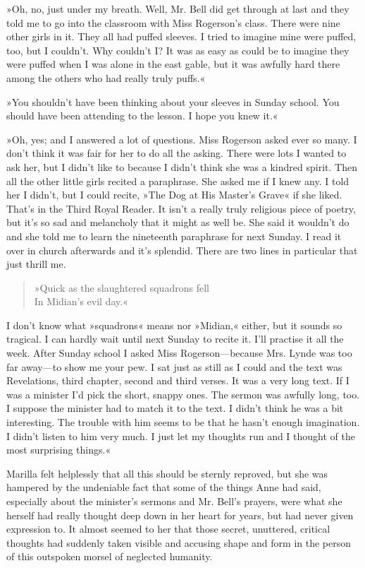 »Oh, no, just under my breath. Well, Mr. Bell did get through at last and they told me to go into the classroom with Miss Rogerson's class. There were nine other girls in it. They all had puffed sleeves. I tried to imagine mine were puffed, too, but I couldn't. Why couldn't I? It was as easy as could be to imagine they were puffed when I was alone in the east gable, but it was awfully hard there among the others who had really truly puffs.«

»You shouldn't have been thinking about your sleeves in Sunday school. You should have been attending to the lesson. I hope you knew it.«

»Oh, yes; and I answered a lot of questions. Miss Rogerson asked ever so many. I don't think it was fair for her to do all the asking. There were lots I wanted to ask her, but I didn't like to because I didn't think she was a kindred spirit. Then all the other little girls recited a paraphrase. She asked me if I knew any. I told her I didn't, but I could recite, »The Dog at His Master's Grave« if she liked. That's in the Third Royal Reader. It isn't a really truly religious piece of poetry, but it's so sad and melancholy that it might as well be. She said it wouldn't do and she told me to learn the nineteenth paraphrase for next Sunday. I read it over in church afterwards and it's splendid. There are two lines in particular that just thrill me.

\begin{verse}
»Quick as the slaughtered squadrons fell\\
In Midian's evil day.«
\end{verse}

I don't know what »squadrons« means nor »Midian,« either, but it sounds so tragical. I can hardly wait until next Sunday to recite it. I'll practise it all the week. After Sunday school I asked Miss Rogerson—because Mrs. Lynde was too far away—to show me your pew. I sat just as still as I could and the text was Revelations, third chapter, second and third verses. It was a very long text. If I was a minister I'd pick the short, snappy ones. The sermon was awfully long, too. I suppose the minister had to match it to the text. I didn't think he was a bit interesting. The trouble with him seems to be that he hasn't enough imagination. I didn't listen to him very much. I just let my thoughts run and I thought of the most surprising things.«

Marilla felt helplessly that all this should be sternly reproved, but she was hampered by the undeniable fact that some of the things Anne had said, especially about the minister's sermons and Mr. Bell's prayers, were what she herself had really thought deep down in her heart for years, but had never given expression to. It almost seemed to her that those secret, unuttered, critical thoughts had suddenly taken visible and accusing shape and form in the person of this outspoken morsel of neglected humanity.